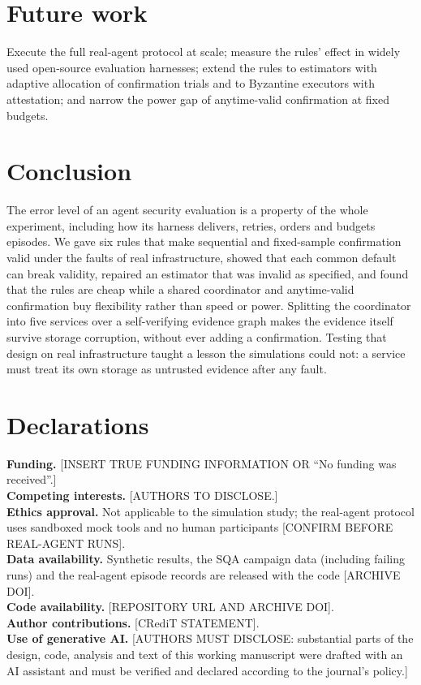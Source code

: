 \documentclass[11pt]{article}
\theoremstyle{definition}
\newcommand{\todo}[1]{\textcolor{red!70!black}{[#1]}}
\begin{document}
\section{Future work}\label{sec:future}
Execute the full real-agent protocol at scale; measure the rules' effect in widely used open-source evaluation harnesses; extend the rules to estimators with adaptive allocation of confirmation trials and to Byzantine executors with attestation; and narrow the power gap of anytime-valid confirmation at fixed budgets.

\section{Conclusion}\label{sec:conclusion}
The error level of an agent security evaluation is a property of the whole experiment, including how its harness delivers, retries, orders and budgets episodes. We gave six rules that make sequential and fixed-sample confirmation valid under the faults of real infrastructure, showed that each common default can break validity, repaired an estimator that was invalid as specified, and found that the rules are cheap while a shared coordinator and anytime-valid confirmation buy flexibility rather than speed or power. Splitting the coordinator into five services over a self-verifying evidence graph makes the evidence itself survive storage corruption, without ever adding a confirmation. Testing that design on real infrastructure taught a lesson the simulations could not: a service must treat its own storage as untrusted evidence after any fault.

\section*{Declarations}
\noindent\textbf{Funding.} \todo{INSERT TRUE FUNDING INFORMATION OR ``No funding was received''.}\\
\textbf{Competing interests.} \todo{AUTHORS TO DISCLOSE.}\\
\textbf{Ethics approval.} Not applicable to the simulation study; the real-agent protocol uses sandboxed mock tools and no human participants \todo{CONFIRM BEFORE REAL-AGENT RUNS}.\\
\textbf{Data availability.} Synthetic results, the SQA campaign data (including failing runs) and the real-agent episode records are released with the code \todo{ARCHIVE DOI}.\\
\textbf{Code availability.} \todo{REPOSITORY URL AND ARCHIVE DOI}.\\
\textbf{Author contributions.} \todo{CRediT STATEMENT}.\\
\textbf{Use of generative AI.} \todo{AUTHORS MUST DISCLOSE: substantial parts of the design, code, analysis and text of this working manuscript were drafted with an AI assistant and must be verified and declared according to the journal's policy.}



\end{document}
